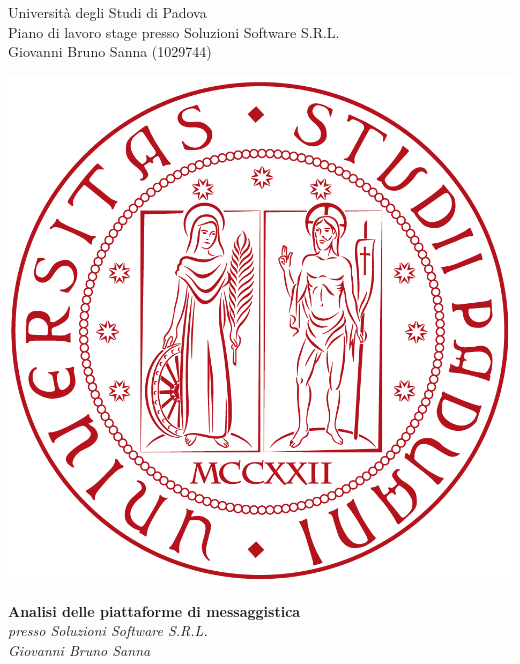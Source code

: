 \documentclass[11pt,notitlepage]{article}
\makeatletter
\newcommand{\nomeStudente}{Giovanni Bruno}
\newcommand{\cognomeStudente}{Sanna}
\newcommand{\matricolaStudente}{1029744}
\newcommand{\emailStudente}{giovannibruno.sanna@studenti.unipd.com}
\newcommand{\telStudente}{+39 0000000000}
\newcommand{\nomeTutorAziendale}{Nome}
\newcommand{\cognomeTutorAziendale}{Cognome}
\newcommand{\emailTutorAziendale}{xxtutor@azienda.it}
\newcommand{\telTutorAziendale}{+39 0000000000}
\newcommand{\ragioneSocAzienda}{Soluzioni Software S.R.L.}
\newcommand{\indirizzoAzienda}{Via Via dei Ronchi, 21, 35127 Padova (PD)}
\newcommand{\sitoAzienda}{http://www.soluzioni-sw.it/}
\makeatother
\begin{document}
	
\noindent
\parbox{0.7\columnwidth}{Università degli Studi di Padova\\
	Piano di lavoro stage presso \ragioneSocAzienda{}\\
	\nomeStudente{} \cognomeStudente{} (\matricolaStudente{})}%
\parbox{0.3\columnwidth}{
	\hfill \includegraphics[scale=0.08]{immagini/logo-unipd.png}}

\bigskip
\begin{center}
{\Huge \textbf{Analisi delle piattaforme di messaggistica}} \\ \bigskip
	{\Large \textit{presso \ragioneSocAzienda{}}}\\ \bigskip
	{\Large \textit{\nomeStudente{} \cognomeStudente{}}}
\end{center}

\end{document}
